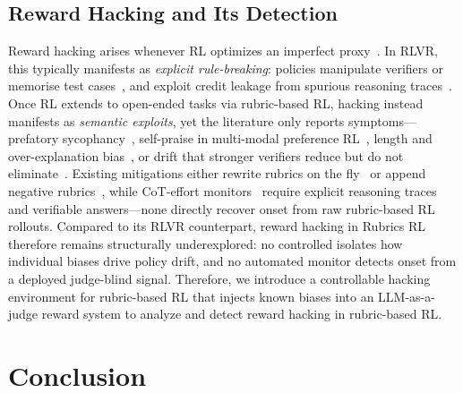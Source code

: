 \documentclass[11pt]{article}
\begin{document}
\subsection{Reward Hacking and Its Detection}

Reward hacking arises whenever RL optimizes an imperfect proxy~\citep{wangRewardHackingEra2026, skalse2025definingcharacterizingrewardhacking, eisensteinHelpingHerdingReward2024}. In RLVR, this typically manifests as \emph{explicit rule-breaking}: policies manipulate verifiers or memorise test cases~\citep{khalifaCountdownCodeTestbedStudying2026, zhaoOneTokenFool2025}, and exploit credit leakage from spurious reasoning traces~\citep{cuiProcessReinforcementImplicit2025, zhaRLTangoReinforcing2025}. Once RL extends to open-ended tasks via rubric-based RL, hacking instead manifests as \emph{semantic exploits}, yet the literature only reports symptoms—prefatory sycophancy~\citep{huangReinforcementLearningRubric2025}, self-praise in multi-modal preference RL~\citep{zhouGenerativeRLHFV2025}, length and over-explanation bias~\citep{jiaWritingZeroBridgeGap2025}, or drift that stronger verifiers reduce but do not eliminate~\citep{mahmoudRewardHackingRubricBased2026}. Existing mitigations either rewrite rubrics on the fly~\citep{rezaeiOnlineRubricsElicitation2025} or append negative rubrics~\citep{shaoDRTuluReinforcement2025}, while CoT-effort monitors~\citep{wangItThinkingCheating2026, guanMonitoringMonitorability2025} require explicit reasoning traces and verifiable answers—none directly recover onset from raw rubric-based RL rollouts. Compared to its RLVR counterpart, reward hacking in Rubrics RL therefore remains structurally underexplored: no controlled isolates how individual biases drive policy drift, and no automated monitor detects onset from a deployed judge-blind signal. Therefore, we introduce a controllable hacking environment for rubric-based RL that injects known biases into an LLM-as-a-judge reward system to analyze and detect reward hacking in rubric-based RL.





\section{Conclusion}
\label{sec:conclusion}
\end{document}
